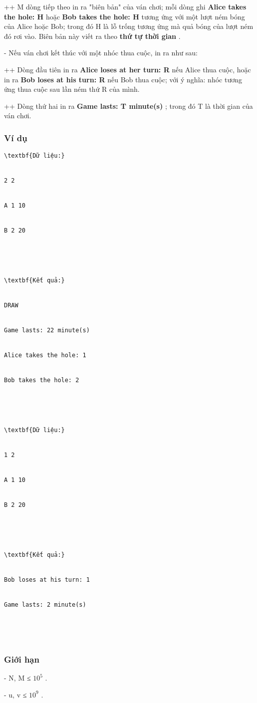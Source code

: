   ++ M dòng tiếp theo in ra "biên bản" của ván chơi; mỗi dòng ghi   \textbf{    Alice takes the hole: H   }   hoặc   \textbf{    Bob takes the hole: H   }   tương ứng với một lượt ném bóng của Alice hoặc Bob; trong đó H là lỗ trống tương ứng mà quả bóng của lượt ném đó rơi vào. Biên bản này viết ra theo   \textbf{    thứ tự thời gian   }   .  

   - Nếu ván chơi kết thúc với một nhóc thua cuộc, in ra như sau:   


   ++ Dòng đầu tiên in ra   \textbf{    Alice loses at her turn: R   }   nếu Alice thua cuộc, hoặc in ra   \textbf{    Bob loses at his turn: R   }   nếu Bob thua cuộc; với ý nghĩa: nhóc tương ứng thua cuộc sau lần ném thứ R của mình.   


   ++ Dòng thứ hai in ra   \textbf{    Game lasts: T minute(s)   }   ; trong đó T là thời gian của ván chơi.  

\subsubsection{   Ví dụ  }
\begin{verbatim}
\textbf{Dữ liệu:}


2 2


A 1 10


B 2 20





\textbf{Kết quả:}


DRAW


Game lasts: 22 minute(s)


Alice takes the hole: 1


Bob takes the hole: 2





\textbf{Dữ liệu:}


1 2


A 1 10


B 2 20





\textbf{Kết quả:}


Bob loses at his turn: 1


Game lasts: 2 minute(s)





\end{verbatim}

\subsubsection{   Giới hạn  }

   - N, M ≤ $10^{5}$   .   


   - u, v ≤ $10^{9}$   .  


